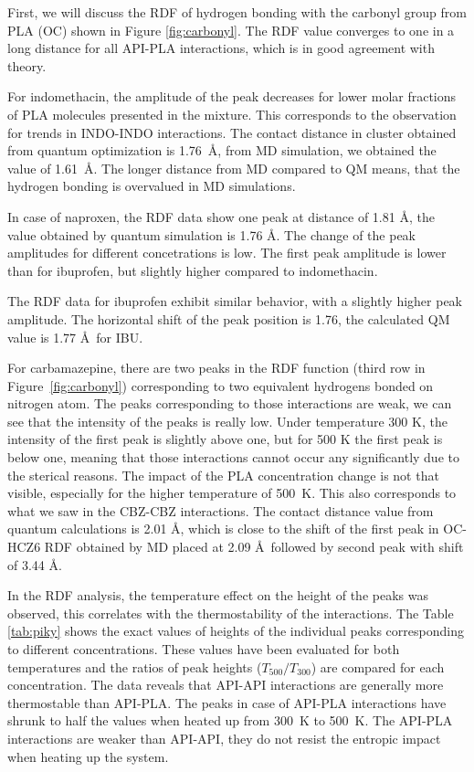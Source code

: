 \newpage
First, we will discuss the RDF of hydrogen bonding with the carbonyl group from PLA (OC) shown in Figure \ref{fig:carbonyl}. The RDF value converges to one in a long distance for all API-PLA interactions, which is in good agreement with theory.

For indomethacin, the amplitude of the peak decreases for lower molar fractions of PLA molecules presented in the mixture. This corresponds to the observation for trends in INDO-INDO interactions. The contact distance in cluster obtained from quantum optimization is 1.76~\AA, from MD simulation, we obtained the value of 1.61~\AA. The longer distance from MD compared to QM means, that the hydrogen bonding is overvalued in MD simulations.

In case of naproxen, the RDF data show one peak at distance of 1.81 \AA, the value obtained by quantum simulation is 1.76 \AA. The change of the peak amplitudes for different concetrations is low. The first peak amplitude is lower than for ibuprofen, but slightly higher compared to indomethacin. 

\newpage
The RDF data for ibuprofen exhibit similar behavior, with a slightly higher peak amplitude.   The horizontal shift of the peak position is 1.76, the calculated QM value is 1.77 \AA~for IBU.


For carbamazepine, there are two peaks in the RDF function (third row in Figure~\ref{fig:carbonyl}) corresponding to two equivalent hydrogens bonded on nitrogen atom. The peaks corresponding to those interactions are weak, we can see that the intensity of the peaks is really low. Under temperature 300 K, the intensity of the first peak is slightly above one, but for 500 K the first peak is below one, meaning that those interactions cannot occur any significantly due to the sterical reasons. The impact of the PLA concentration change is not that visible, especially for the higher temperature of 500~K. This also corresponds to what we saw in the CBZ-CBZ interactions. The contact distance value from quantum calculations is 2.01 \AA, which is close to the shift of the first peak in OC-HCZ6 RDF obtained by MD placed at 2.09 \AA~followed by second peak with shift of 3.44 \AA.

In the RDF analysis, the temperature effect on the height of the peaks was observed, this correlates with the thermostability of the interactions. The Table \ref{tab:piky} shows the exact values of heights of the individual peaks corresponding to different concentrations. These values have been evaluated for both temperatures and the ratios of peak heights ($T_{500}/T_{300}$) are compared for each concentration. The data reveals that API-API interactions are generally more thermostable than API-PLA. The peaks in case of API-PLA interactions have shrunk to half the values when heated up from 300~K to 500~K. The API-PLA interactions are weaker than API-API, they do not resist the entropic impact when heating up the system.

